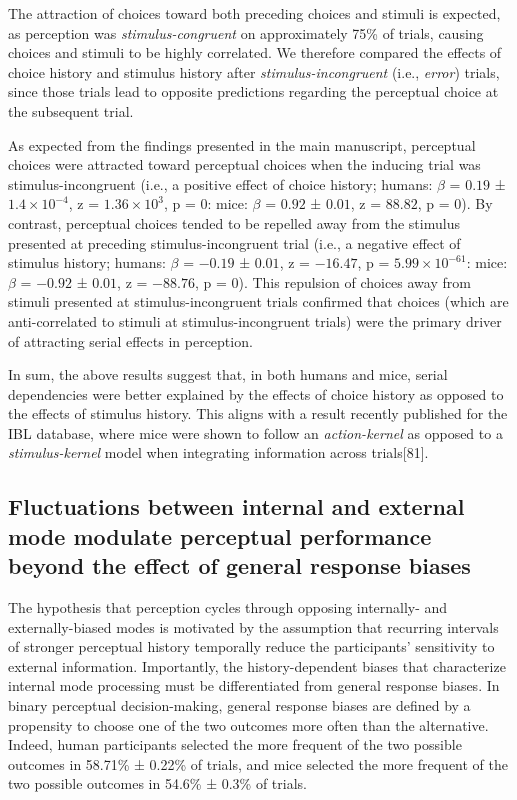 \documentclass[
]{article}
\begin{document}
The attraction of choices toward both preceding choices and stimuli is
expected, as perception was \emph{stimulus-congruent} on approximately
75\% of trials, causing choices and stimuli to be highly correlated. We
therefore compared the effects of choice history and stimulus history
after \emph{stimulus-incongruent} (i.e., \emph{error}) trials, since
those trials lead to opposite predictions regarding the perceptual
choice at the subsequent trial.

As expected from the findings presented in the main manuscript,
perceptual choices were attracted toward perceptual choices when the
inducing trial was stimulus-incongruent (i.e., a positive effect of
choice history; humans: \(\beta\) = \(0.19\) ±
\(\ensuremath{1.4\times 10^{-4}}\), z =
\(\ensuremath{1.36\times 10^{3}}\), p = \(0\): mice: \(\beta\) =
\(0.92\) ± \(0.01\), z = \(88.82\), p = \(0\)). By contrast, perceptual
choices tended to be repelled away from the stimulus presented at
preceding stimulus-incongruent trial (i.e., a negative effect of
stimulus history; humans: \(\beta\) = \(-0.19\) ± \(0.01\), z =
\(-16.47\), p = \(\ensuremath{5.99\times 10^{-61}}\): mice: \(\beta\) =
\(-0.92\) ± \(0.01\), z = \(-88.76\), p = \(0\)). This repulsion of
choices away from stimuli presented at stimulus-incongruent trials
confirmed that choices (which are anti-correlated to stimuli at
stimulus-incongruent trials) were the primary driver of attracting
serial effects in perception.

In sum, the above results suggest that, in both humans and mice, serial
dependencies were better explained by the effects of choice history as
opposed to the effects of stimulus history. This aligns with a result
recently published for the IBL database, where mice were shown to follow
an \emph{action-kernel} as opposed to a \emph{stimulus-kernel} model
when integrating information across trials{[}81{]}.

\hypertarget{fluctuations-between-internal-and-external-mode-modulate-perceptual-performance-beyond-the-effect-of-general-response-biases}{%
\subsection{Fluctuations between internal and external mode modulate
perceptual performance beyond the effect of general response
biases}\label{fluctuations-between-internal-and-external-mode-modulate-perceptual-performance-beyond-the-effect-of-general-response-biases}}

The hypothesis that perception cycles through opposing internally- and
externally-biased modes is motivated by the assumption that recurring
intervals of stronger perceptual history temporally reduce the
participants' sensitivity to external information. Importantly, the
history-dependent biases that characterize internal mode processing must
be differentiated from general response biases. In binary perceptual
decision-making, general response biases are defined by a propensity to
choose one of the two outcomes more often than the alternative. Indeed,
human participants selected the more frequent of the two possible
outcomes in 58.71\% ± 0.22\% of trials, and mice selected the more
frequent of the two possible outcomes in 54.6\% ± 0.3\% of trials.
\end{document}

